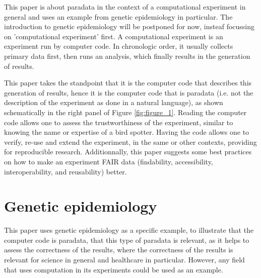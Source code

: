 
This paper is about paradata in the context of a computational
experiment in general and uses an example from genetic 
epidemiology in particular.
The introduction to genetic epidemiology will be postponed for now,
insteaf focussing on 'computational experiment' first.
A computational experiment is an experiment run by computer code.
In chronologic order, it usually collects primary data first, 
then runs an analysis, which finally results in the generation of results.

This paper takes the standpoint that it is the computer code 
that describes this generation of results, 
hence it is the computer code that is paradata 
(i.e. not the description of the experiment as done in a natural language),
as shown schematically in the right panel of Figure \ref{fig:figure_1}.
Reading the computer code allows one to assess the trustworthiness 
of the experiment, similar to knowing the name or expertise of a bird spotter.
Having the code allows one to 
verify, re-use and extend the experiment, 
in the same or other contexts, providing for reproducible research.
Additionnally, this paper suggests some best practices on how to make 
an experiment FAIR data (findability, accessibility, interoperability, and reusability) \cite{wilkinson2016fair} better.

\section{Genetic epidemiology}


This paper uses genetic epidemiology as a specific example,
to illustrate that the computer code is paradata,
that this type of paradata is relevant, as it helps 
to assess the correctness of the results,
where the correctness of the results is relevant for 
science in general and healthcare in particular.
However, any field that uses computation in its experiments
could be used as an example.

